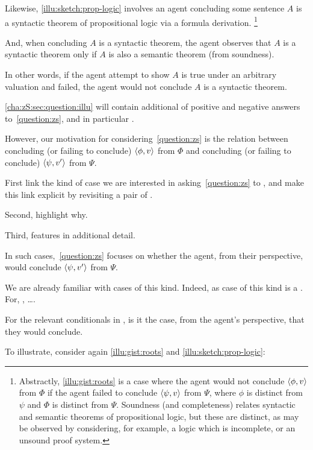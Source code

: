 \begin{note}
  Likewise, \autoref{illu:sketch:prop-logic} involves an agent concluding some sentence \(A\) is a syntactic theorem of propositional logic via a formula derivation.%
  \footnote{
    Abstractly, \autoref{illu:gist:roots} is a case where the agent would not conclude \(\langle \phi, v \rangle\) from \(\Phi\) if the agent failed to conclude \(\langle \psi, v \rangle\) from \(\Psi\), where \(\phi\) is distinct from \(\psi\) and \(\Phi\) is distinct from \(\Psi\).
    Soundness (and completeness) relates syntactic and semantic theorems of propositional logic, but these are distinct, as may be observed by considering, for example, a logic which is incomplete, or an unsound proof system.
  }

  And, when concluding \(A\) is a syntactic theorem, the agent observes that \(A\) is a syntactic theorem only if \(A\) is also a semantic theorem (from soundness).

  In other words, if the agent attempt to show \(A\) is true under an arbitrary valuation and failed, the agent would not conclude \(A\) is a syntactic theorem.
\end{note}

\begin{note}
  \autoref{cha:zS:sec:question:illu} will contain additional  of positive and negative answers to~\autoref{question:zs}, and in particular .

  However, our motivation for considering~\autoref{question:zs} is the relation between concluding (or failing to conclude)  \(\langle \phi, v \rangle\) from \(\Phi\) and concluding (or failing to conclude) \(\langle \psi, v' \rangle\) from \(\Psi\).

  First link the kind of case we are interested in asking~\autoref{question:zs} to , and make this link explicit by revisiting a pair of .

  Second, highlight why.

  Third, features in additional detail.
\end{note}

\begin{note}
  {
    \color{red}
    In such cases,~\autoref{question:zs} focuses on whether the agent, from their perspective, would conclude \(\langle \psi, v' \rangle\) from \(\Psi\).

    We are already familiar with cases of this kind.
    Indeed, as case of this kind is a .
    For, , \dots.

    For the relevant conditionals in , is it the case, from the agent's perspective, that they would conclude.
  }

  To illustrate, consider again \autoref{illu:gist:roots} and \autoref{illu:sketch:prop-logic}:
\end{note}


